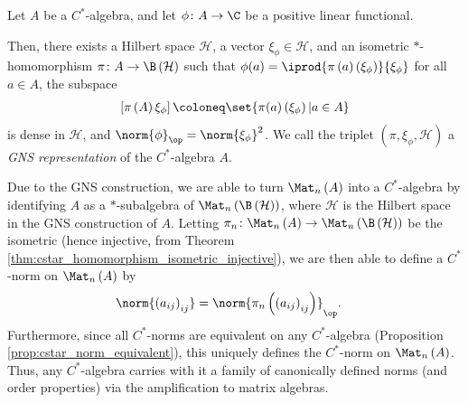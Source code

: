\begin{theorem}\label{thm:gns_construction}
  Let $A$ be a $C^{\ast}$-algebra, and let $\phi\colon A\rightarrow \C$ be a positive linear functional.\newline

  Then, there exists a Hilbert space $\mathcal{H}$, a vector $\xi_{\phi}\in \mathcal{H}$, and an isometric $\ast$-homomorphism $\pi\colon A\rightarrow \B\left( \mathcal{H} \right)$ such that $\phi(a) = \iprod{\pi\left( a \right)\left( \xi_{\phi} \right)}{\xi_{\phi}}$ for all $a\in A$, the subspace
  \begin{align*}
    \left[ \pi\left( A \right)\xi_{\phi} \right] \coloneq \set{\pi(a)\left( \xi_{\phi} \right) | a\in A}
  \end{align*}
  is dense in $\mathcal{H}$, and $\norm{\phi}_{\op} = \norm{\xi_{\phi}}^2$. We call the triplet $\left( \pi,\xi_{\phi},\mathcal{H} \right)$ a \textit{GNS representation} of the $C^{\ast}$-algebra $A$.
\end{theorem}
Due to the GNS construction, we are able to turn $\Mat_n\left( A \right)$ into a $C^{\ast}$-algebra by identifying $A$ as a $\ast$-subalgebra of $\Mat_n\left( \B\left( \mathcal{H} \right) \right)$, where $\mathcal{H}$ is the Hilbert space in the GNS construction of $A$. Letting $\pi_{n}\colon \Mat_n\left( A \right)\rightarrow \Mat_n\left( \B\left( \mathcal{H} \right) \right)$ be the isometric (hence injective, from Theorem \ref{thm:cstar_homomorphism_isometric_injective}), we are then able to define a $C^{\ast}$-norm on $\Mat_n\left( A \right)$ by
\begin{align*}
  \norm{\left( a_{ij} \right)_{ij}} &= \norm{\pi_n\left( \left( a_{ij} \right)_{ij} \right)}_{\op}.
\end{align*}
Furthermore, since all $C^{\ast}$-norms are equivalent on any $C^{\ast}$-algebra (Proposition \ref{prop:cstar_norm_equivalent}), this uniquely defines the $C^{\ast}$-norm on $\Mat_n\left( A \right)$. Thus, any $C^{\ast}$-algebra carries with it a family of canonically defined norms (and order properties) via the amplification to matrix algebras.
